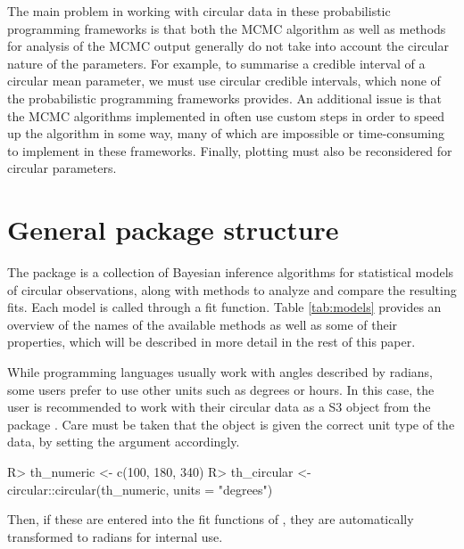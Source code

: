 The main problem in working with circular data in these probabilistic
programming frameworks is that both the MCMC algorithm as well as
methods for analysis of the MCMC output generally do not take into
account the circular nature of the parameters. For example, to summarise
a credible interval of a circular mean parameter, we must use circular
credible intervals, which none of the probabilistic programming
frameworks provides. An additional issue is that the MCMC algorithms
implemented in  often use custom steps in order to speed
up the algorithm in some way, many of which are impossible or
time-consuming to implement in these frameworks. Finally, plotting must
also be reconsidered for circular parameters.

\hypertarget{general-package-structure}{%
\section{General package structure}\label{general-package-structure}}

\label{sec:pkgstruct}

The package  is a collection of Bayesian inference
algorithms for statistical models of circular observations, along with
methods to analyze and compare the resulting fits. Each model is called
through a fit function. Table \ref{tab:models} provides an overview of
the names of the available methods as well as some of their properties,
which will be described in more detail in the rest of this paper.

While programming languages usually work with angles described by
radians, some users prefer to use other units such as degrees or hours.
In this case, the user is recommended to work with their circular data
as a  S3 object from the package . Care
must be taken that the  object is given the correct unit
type of the data, by setting the  argument accordingly.

\begin{CodeChunk}

\begin{CodeInput}
R> th_numeric  <- c(100, 180, 340)
R> th_circular <- circular::circular(th_numeric, units = "degrees")
\end{CodeInput}
\end{CodeChunk}

Then, if these are entered into the fit functions of ,
they are automatically transformed to radians for internal use.


